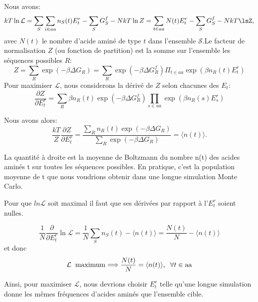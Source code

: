 Nous avons:
\begin{equation}
  kT \ln \mathcal{L} = \sum_S\sum_{i \in aa} n_S(t)E^r_t - \sum_S G^f_S - N kT \ln Z
                     = \sum_{t \in aa} N(t) E^r_t - \sum_SG^f_S - N kT \lnZ,
\end{equation}
avec $N(t)$ le nombre d'acide aminé de type $t$ dans l'ensemble $\mathcal{S}$.Le facteur de normalisation $Z$ (ou fonction de partition) est la somme sur l'ensemble les séquences possibles $R$:
\begin{equation}
  Z=\sum_R \exp(-\beta \Delta G_R) = \sum_R \exp(-\beta\Delta G^f_R)\Pi_{t\in aa}\exp(\beta n_R (t) E^r_t)
\end{equation} 
Pour maximiser $\mathcal{L}$, nous considerons la dérivé de $Z$ selon chacunes des $E_t$:
\begin{equation}
\frac{ \partial Z }{ \partial E^r_t } = 
   \sum_R \beta n_R(t) \exp (-\beta \Delta G^f_R) \prod_{s \in aa} \exp(\beta n_R(s) E^r_s) 
\end{equation}

Nous avons alors:
\begin{equation}
\frac{kT}{Z} \frac{ \partial Z }{ \partial E^r_t }
   = \frac{ \sum_R n_R(t) \exp(-\beta \Delta G_R) }{ \sum_R \exp(-\beta \Delta G_R) } = \langle n(t) \rangle.
\end{equation}

La quantité à droite est la moyenne de Boltzmann du nombre n(t) des acides aminés t sur toutes les séquences possibles. En pratique, c'est la population moyenne de t que nous voudrions obtenir dans une longue simulation Monte Carlo. 

Pour que $ln \mathcal{L}$ soit maximal il faut que ses dérivées par rapport à l'$E_t^r$ soient nulles.

\begin{equation}
\frac{1}{N} \frac{\partial}{\partial E^r_t} \ln {\mathcal L} = \frac{1}{N} \sum_S n_S(t) - \langle n(t) \rangle 
   = \frac{N(t)}{N} - \langle n(t) \rangle
\end{equation}
et donc
\begin{displaymath}
{\mathcal L} \hspace*{2mm} {\rm maximum} \Longrightarrow \frac{N(t)}{N} = \langle n(t) \rangle, 
\hspace*{2mm} \forall t \in {\rm aa}
\label{eq:optimum}
\end{displaymath}

Ainsi, pour maximiser $\mathcal{L}$, nous devrions choisir ${E^r_t}$ telle qu'une longue simulation donne les mêmes fréquences d'acides aminés que l'ensemble cible.


